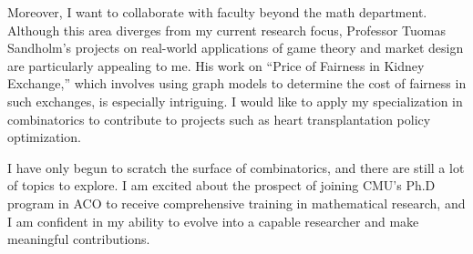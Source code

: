 \documentclass[12pt]{article}
\begin{document}
Moreover, I want to collaborate with faculty beyond the math department. Although this area diverges
from my current research focus, Professor Tuomas Sandholm's projects on real-world applications of
game theory and market design are particularly appealing to me. His work on ``Price of Fairness in
Kidney Exchange,'' which involves using graph models to determine the cost of fairness in such
exchanges, is especially intriguing. I would like to apply my specialization in combinatorics to
contribute to projects such as heart transplantation policy optimization.

I have only begun to scratch the surface of combinatorics, and there are still a lot of topics to
explore. I am excited about the prospect of joining CMU's Ph.D program in ACO to receive
comprehensive training in mathematical research, and I am confident in my ability to evolve into a
capable researcher and make meaningful contributions. 
\end{document}

